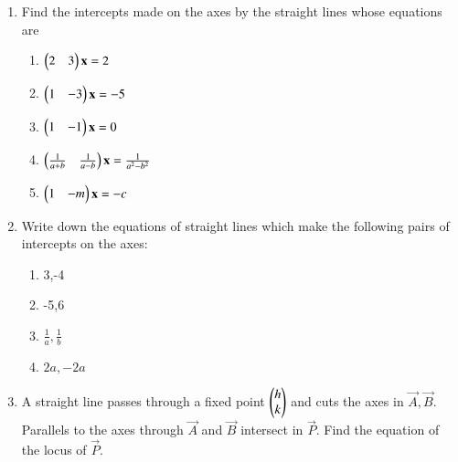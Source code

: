 \renewcommand{\theequation}{\theenumi}
\begin{enumerate}[label=\arabic*.,ref=\thesubsection.\theenumi]
\item Find the intercepts made on the axes by the straight lines whose equations are
\begin{multicols}{2}
\begin{enumerate}
\item
$
\begin{pmatrix}2 & 3\end{pmatrix}\mathbf{x} = 2
$
\item
$
\begin{pmatrix}1 & -3\end{pmatrix}\mathbf{x} = -5
$ 
\item
$
\begin{pmatrix}1 & -1\end{pmatrix}\mathbf{x} = 0
$
\item
$
\begin{pmatrix}\frac{1}{a+b} & \frac{1}{a-b}\end{pmatrix}\mathbf{x} = \frac{1}{a^2-b^2}
$
\item 
$
\begin{pmatrix}1 & -m\end{pmatrix}\mathbf{x} = -c
$
\end{enumerate}
\end{multicols}
\item Write down the equations of straight lines which make the following pairs of intercepts on the axes:
\begin{multicols}{2}
\begin{enumerate}
\item 3,-4
\item -5,6
\item 
$
\frac{1}{a},\frac{1}{b}
$
\item 
$
2a,-2a
$
\end{enumerate}
\end{multicols}
\item A straight line passes through a fixed point $\begin{pmatrix}h\\k\end{pmatrix}$ and cuts the axes in $\vec{A},\vec{B}$.  Parallels to the
axes through $\vec{A}$ and $\vec{B}$ intersect in $\vec{P}$.  Find the equation of the locus of $\vec{P}$.
\end{enumerate}
